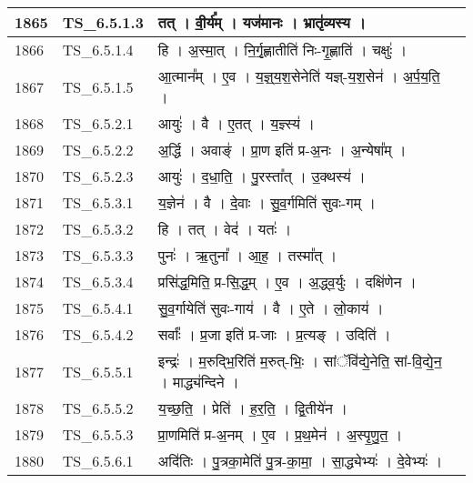 \documentclass[17pt]{extarticle}
\begin{document}
\begin{longtable}{||p{0.4in}||p{0.9in}||p{4.0in}||p{0.9in}||}
        \hline
            1865 & TS\_6.5.1.3 & तत्   ।   वी॒र्य᳚म्   ।   यज॑मानः   ।   भ्रातृ॑व्यस्य   ।    &      \\
        \hline
            1866 & TS\_6.5.1.4 & हि   ।   अ॒स्मा॒त्   ।   नि॒र्गृ॒ह्णातीति॑ निः{-}गृ॒ह्णाति॑   ।   चक्षुः॑   ।    &      \\
        \hline
            1867 & TS\_6.5.1.5 & आ॒त्मान᳚म्   ।   ए॒व   ।   य॒ज्ञ्॒य॒श॒सेनेति॑ यज्ञ्{-}य॒श॒सेन॑   ।   अ॒र्प॒य॒ति॒   ।    &      \\
        \hline
            1868 & TS\_6.5.2.1 & आयुः॑   ।   वै   ।   ए॒तत्   ।   य॒ज्ञ्स्य॑   ।    &      \\
        \hline
            1869 & TS\_6.5.2.2 & अ॒र्द्धि   ।   अवाङ्॑   ।   प्रा॒ण इति॑ प्र{-}अ॒नः   ।   अ॒न्येषा᳚म्   ।    &      \\
        \hline
            1870 & TS\_6.5.2.3 & आयुः॑   ।   द॒धा॒ति॒   ।   पु॒रस्ता᳚त्   ।   उ॒क्थस्य॑   ।    &      \\
        \hline
            1871 & TS\_6.5.3.1 & य॒ज्ञेन॑   ।   वै   ।   दे॒वाः   ।   सु॒व॒र्गमिति॑ सुवः{-}गम्   ।    &      \\
        \hline
            1872 & TS\_6.5.3.2 & हि   ।   तत्   ।   वेद॑   ।   यतः॑   ।    &      \\
        \hline
            1873 & TS\_6.5.3.3 & पुनः॑   ।   ऋ॒तुना᳚   ।   आ॒ह॒   ।   तस्मा᳚त्   ।    &      \\
        \hline
            1874 & TS\_6.5.3.4 & प्रसि॑द्ध॒मिति॒ प्र{-}सि॒द्ध॒म्   ।   ए॒व   ।   अ॒द्ध्व॒र्युः   ।   दक्षि॑णेन   ।    &      \\
        \hline
            1875 & TS\_6.5.4.1 & सु॒व॒र्गायेति॑ सुवः{-}गाय॑   ।   वै   ।   ए॒ते   ।   लो॒काय॑   ।    &      \\
        \hline
            1876 & TS\_6.5.4.2 & सर्वाः᳚   ।   प्र॒जा इति॑ प्र{-}जाः   ।   प्र॒त्यङ्   ।   उदिति॑   ।    &      \\
        \hline
            1877 & TS\_6.5.5.1 & इन्द्रः॑   ।   म॒रुद्भि॒रिति॑ म॒रुत्{-}भिः॒   ।   सांॅवि॑द्ये॒नेति॒ सां{-}वि॒द्ये॒न॒   ।   माद्ध्य॑न्दिने   ।    &      \\
        \hline
            1878 & TS\_6.5.5.2 & य॒च्छ॒ति॒   ।   प्रेति॑   ।   ह॒र॒ति॒   ।   द्वि॒तीये॑न   ।    &      \\
        \hline
            1879 & TS\_6.5.5.3 & प्रा॒णमिति॑ प्र{-}अ॒नम्   ।   ए॒व   ।   प्र॒थ॒मेन॑   ।   अ॒स्पृ॒णु॒त॒   ।    &      \\
        \hline
            1880 & TS\_6.5.6.1 & अदि॑तिः   ।   पु॒त्रका॒मेति॑ पु॒त्र{-}का॒मा॒   ।   सा॒द्ध्येभ्यः॑   ।   दे॒वेभ्यः॑   ।    &      \\

\end{longtable}
\end{document}
